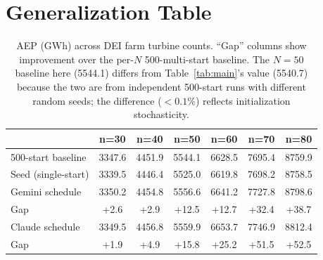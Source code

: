 \documentclass{article}
\begin{document}
\section{Generalization Table}
\label{app:gen_table}


\begin{table}[h]
\centering
\small
\caption{AEP (GWh) across DEI farm turbine counts. ``Gap''
columns show improvement over the per-$N$ 500-multi-start baseline.
The $N\!=\!50$ baseline here (5544.1) differs from
Table~\ref{tab:main}'s value (5540.7) because the two are from
independent 500-start runs with different random seeds; the
difference ($<\!0.1\%$) reflects initialization stochasticity.}
\label{tab:generalization}
\begin{tabular}{lcccccc}
\toprule
 & \textbf{n=30} & \textbf{n=40} & \textbf{n=50} & \textbf{n=60} & \textbf{n=70} & \textbf{n=80} \\
\midrule
500-start baseline  & 3347.6 & 4451.9 & 5544.1 & 6628.5 & 7695.4 & 8759.9 \\
Seed (single-start) & 3339.5 & 4446.4 & 5525.0 & 6619.8 & 7698.2 & 8758.5 \\
\midrule
Gemini schedule    & 3350.2 & 4454.8 & 5556.6 & 6641.2 & 7727.8 & 8798.6 \\
\quad Gap           & +2.6   & +2.9   & +12.5  & +12.7  & +32.4  & +38.7 \\
Claude schedule    & 3349.5 & 4456.8 & 5559.9 & 6653.7 & 7746.9 & 8812.4 \\
\quad Gap           & +1.9   & +4.9   & +15.8  & +25.2  & +51.5  & +52.5 \\
\bottomrule
\end{tabular}
\end{table}
\end{document}
